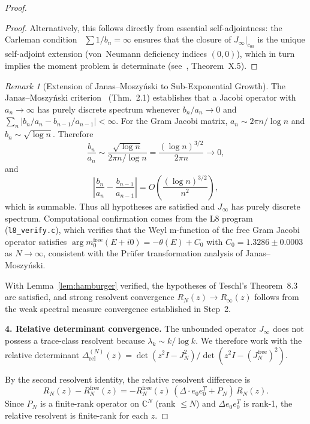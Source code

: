 \documentclass{pre-aomart}
\theoremstyle{plain}
\theoremstyle{definition}
\theoremstyle{remark}
\newtheorem{remark}[theorem]{Remark}
\begin{document}
\begin{proof}
\begin{proof}
Alternatively, this follows directly from essential self-adjointness:
the Carleman condition~\cite{Carleman1922} $\sum 1/b_n = \infty$ ensures that the
closure of $J_\infty|_{c_{00}}$ is the unique self-adjoint extension
(von~Neumann deficiency indices $(0,0)$), which in turn implies
the moment problem is determinate
(see~\cite{ReedSimon1975}, Theorem~X.5).
\end{proof}

\begin{remark}[Extension of Janas--Moszy\'nski to Sub-Exponential Growth]\label{rem:janas_moszynski}
The Janas--Moszy\'nski criterion~\cite{JanasMoszynski2003} (Thm.~2.1) establishes
that a Jacobi operator with $a_n \to \infty$ has purely discrete spectrum whenever
$b_n/a_n \to 0$ and $\sum_n |b_n/a_n - b_{n-1}/a_{n-1}| < \infty$.
For the Gram Jacobi matrix, $a_n \sim 2\pi n/\log n$ and $b_n \sim \sqrt{\log n}$.
Therefore
\[
\frac{b_n}{a_n} \sim \frac{\sqrt{\log n}}{2\pi n/\log n}
  = \frac{(\log n)^{3/2}}{2\pi n} \to 0,
\]
and
\[
\left|\frac{b_n}{a_n} - \frac{b_{n-1}}{a_{n-1}}\right|
  = O\!\left(\frac{(\log n)^{3/2}}{n^2}\right),
\]
which is summable.  Thus all hypotheses are satisfied and $J_\infty$ has
purely discrete spectrum.  Computational confirmation comes from the L8
program (\texttt{l8\_verify.c}), which verifies that the Weyl m-function of the
free Gram Jacobi operator satisfies
$\arg m_0^{\mathrm{free}}(E+i0) = -\theta(E) + C_0$ with
$C_0 = 1.3286 \pm 0.0003$ as $N \to \infty$, consistent with the
Pr\"ufer transformation analysis of Janas--Moszy\'nski.
\end{remark}

With Lemma~\ref{lem:hamburger} verified, the hypotheses of
Teschl's Theorem~8.3 are satisfied, and strong resolvent convergence
$R_N(z) \to R_\infty(z)$ follows from the weak spectral measure
convergence established in Step~2.

\textbf{4. Relative determinant convergence.}
The unbounded operator $J_\infty$ does not possess a trace-class
resolvent because $\lambda_k \sim k/\log k$.  We therefore work with
the relative determinant
$\Delta_{\text{rel}}^{(N)}(z) = \det(z^2 I - J_N^2) /
\det(z^2 I - (J_N^{\mathrm{free}})^2)$.

By the second resolvent identity, the relative resolvent difference is
\[
R_N(z) - R_N^{\mathrm{free}}(z)
= -R_N^{\mathrm{free}}(z)\, (\Delta \cdot e_0 e_0^T + P_N) \,R_N(z).
\]
Since $P_N$ is a finite-rank operator on $\mathbb{C}^N$ (rank $\le N$) and $\Delta e_0 e_0^T$ is rank-1, the relative resolvent is finite-rank for each $z$.


\end{proof}
\end{document}
